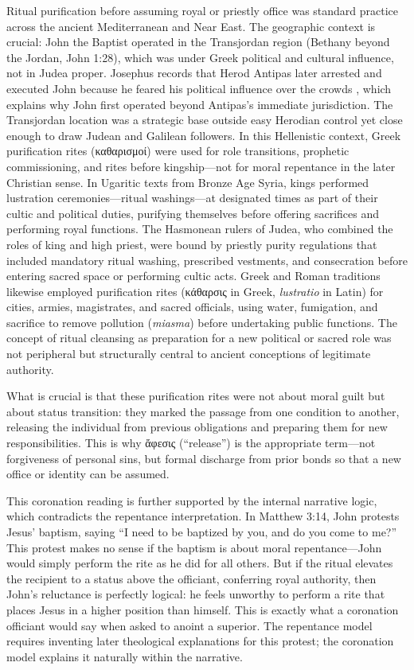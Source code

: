 Ritual purification before assuming royal or priestly office was standard practice across the ancient Mediterranean and Near East.
The geographic context is crucial: John the Baptist operated in the Transjordan region (Bethany beyond the Jordan, John 1:28), which was under Greek political and cultural influence, not in Judea proper.
Josephus records that Herod Antipas later arrested and executed John because he feared his political influence over the crowds \cite[18.116--119]{josephus:ant}, which explains why John first operated beyond Antipas's immediate jurisdiction.
The Transjordan location was a strategic base outside easy Herodian control yet close enough to draw Judean and Galilean followers.
In this Hellenistic context, Greek purification rites (καθαρισμοί) were used for role transitions, prophetic commissioning, and rites before kingship---not for moral repentance in the later Christian sense.
In Ugaritic texts from Bronze Age Syria, kings performed lustration ceremonies---ritual washings---at designated times as part of their cultic and political duties, purifying themselves before offering sacrifices and performing royal functions.
The Hasmonean rulers of Judea, who combined the roles of king and high priest, were bound by priestly purity regulations that included mandatory ritual washing, prescribed vestments, and consecration before entering sacred space or performing cultic acts.
Greek and Roman traditions likewise employed purification rites (κάθαρσις in Greek, \textit{lustratio} in Latin) for cities, armies, magistrates, and sacred officials, using water, fumigation, and sacrifice to remove pollution (\textit{miasma}) before undertaking public functions.
The concept of ritual cleansing as preparation for a new political or sacred role was not peripheral but structurally central to ancient conceptions of legitimate authority.

What is crucial is that these purification rites were not about moral guilt but about status transition: they marked the passage from one condition to another, releasing the individual from previous obligations and preparing them for new responsibilities.
This is why ἄφεσις (``release'') is the appropriate term---not forgiveness of personal sins, but formal discharge from prior bonds so that a new office or identity can be assumed.

This coronation reading is further supported by the internal narrative logic, which contradicts the repentance interpretation.
In Matthew 3:14, John protests Jesus' baptism, saying ``I need to be baptized by you, and do you come to me?''
This protest makes no sense if the baptism is about moral repentance---John would simply perform the rite as he did for all others.
But if the ritual elevates the recipient to a status above the officiant, conferring royal authority, then John's reluctance is perfectly logical: he feels unworthy to perform a rite that places Jesus in a higher position than himself.
This is exactly what a coronation officiant would say when asked to anoint a superior.
The repentance model requires inventing later theological explanations for this protest; the coronation model explains it naturally within the narrative.

